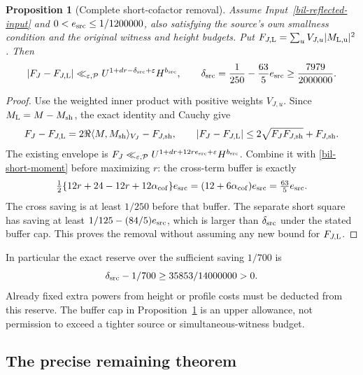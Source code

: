 \documentclass[11pt]{article}
\newtheorem{proposition}[theorem]{Proposition}
\theoremstyle{definition}
\newcommand{\eps}{\varepsilon}
\begin{document}
\begin{proposition}[Complete short-cofactor removal]
\label{bil-complete-removal}
Assume Input~\ref{bil-reflected-input} and
$0<e_{\rm src}\le1/1200000$, also satisfying the source's own
smallness condition and the original witness and height budgets.
Put $F_{J,\rm L}=\sum_uV_{J,u}|M_{\rm L,u}|^2$.  Then
\begin{equation}\label{bil-removal-estimate}
 |F_J-F_{J,\rm L}|\ll_{\eps,\mathcal P}
 U^{1+dr-\delta_{\rm src}+\eps}H^{b_{\rm src}},
 \qquad
 \delta_{\rm src}=\frac1{250}-\frac{63}{5}e_{\rm src}
       \ge\frac{7979}{2000000}.
\end{equation}
\end{proposition}
\begin{proof}
Use the weighted inner product with positive weights $V_{J,u}$.
Since $M_{\rm L}=M-M_{\rm sh}$, the exact identity and Cauchy give
\begin{equation}\label{bil-complete-cross}
 F_J-F_{J,\rm L}
 =2\Re\langle M,M_{\rm sh}\rangle_{V_J}-F_{J,\rm sh},
 \qquad
 |F_J-F_{J,\rm L}|
       \le2\sqrt{F_JF_{J,\rm sh}}+F_{J,\rm sh}.
\end{equation}
The existing envelope is
$F_J\ll_{\eps,\mathcal P}U^{1+dr+12re_{\rm src}+\eps}
H^{b_{\rm src}}$.  Combine it with \eqref{bil-short-moment} before
maximizing $r$: the cross-term buffer is exactly
\[
 \tfrac12\{12r+24-12r+12\alpha_{\rm cof}\}e_{\rm src}
       =(12+6\alpha_{\rm cof})e_{\rm src}=\tfrac{63}{5}e_{\rm src}.
\]
The cross saving is at least $1/250$ before that buffer.
The separate short square has saving at least
$1/125-(84/5)e_{\rm src}$, which is larger than
$\delta_{\rm src}$ under the stated buffer cap.
This proves the removal without assuming any new bound for $F_{J,\rm L}$.
\end{proof}

In particular the exact reserve over the sufficient saving $1/700$ is
\begin{equation}\label{bil-target-reserve}
 \delta_{\rm src}-1/700\ge35853/14000000>0.
\end{equation}
Already fixed extra powers from height or profile costs must be deducted
from this reserve.  The buffer cap in Proposition~\ref{bil-complete-removal}
is an upper allowance, not permission to exceed a tighter source or
simultaneous-witness budget.

\subsection{The precise remaining theorem}
\end{document}
